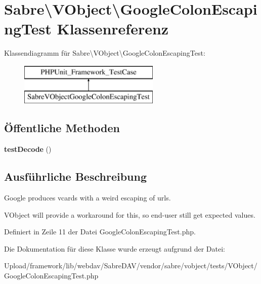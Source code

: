 \hypertarget{class_sabre_1_1_v_object_1_1_google_colon_escaping_test}{}\section{Sabre\textbackslash{}V\+Object\textbackslash{}Google\+Colon\+Escaping\+Test Klassenreferenz}
\label{class_sabre_1_1_v_object_1_1_google_colon_escaping_test}
Klassendiagramm für Sabre\textbackslash{}V\+Object\textbackslash{}Google\+Colon\+Escaping\+Test\+:\begin{figure}[H]
\begin{center}
\leavevmode
\includegraphics[height=2.000000cm]{class_sabre_1_1_v_object_1_1_google_colon_escaping_test}
\end{center}
\end{figure}
\subsection*{Öffentliche Methoden}
\begin{DoxyCompactItemize}
\item 
\mbox{\label{class_sabre_1_1_v_object_1_1_google_colon_escaping_test_ad2670f34c716367afa6693025116f4a7}} 
{\bfseries test\+Decode} ()
\end{DoxyCompactItemize}


\subsection{Ausführliche Beschreibung}
Google produces vcards with a weird escaping of urls.

V\+Object will provide a workaround for this, so end-\/user still get expected values. 

Definiert in Zeile 11 der Datei Google\+Colon\+Escaping\+Test.\+php.



Die Dokumentation für diese Klasse wurde erzeugt aufgrund der Datei\+:\begin{DoxyCompactItemize}
\item 
Upload/framework/lib/webdav/\+Sabre\+D\+A\+V/vendor/sabre/vobject/tests/\+V\+Object/Google\+Colon\+Escaping\+Test.\+php\end{DoxyCompactItemize}
